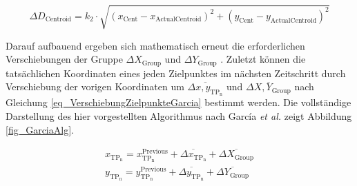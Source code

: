 \begin{equation} \label{eq_GarciaGruppenzentrumbewegung}
\Delta D_{\mathrm{Centroid}} = k_2 \cdot \sqrt{\left(x_{\mathrm{Cent}}-x_{\mathrm{Actual Centroid}}\right)^2+\left(y_{\mathrm{Cent}}-y_{\mathrm{Actual Centroid}}\right)^2}
\end{equation}

Darauf aufbauend ergeben sich mathematisch erneut die erforderlichen Verschiebungen der Gruppe $\Delta X_{\mathrm{Group}}$ und $\Delta Y_{\mathrm{Group}}$ \cite[S.10]{Garcia2}.
Zuletzt können die tatsächlichen Koordinaten eines jeden Zielpunktes im nächsten Zeitschritt durch Verschiebung der vorigen Koordinaten um $\overline{\Delta x,y_{\mathrm{TP_n}}}$ und $\overline{\Delta X,Y_{\mathrm{Group}}}$ nach Gleichung \ref{eq_VerschiebungZielpunkteGarcia} bestimmt werden.
Die vollständige Darstellung des hier vorgestellten Algorithmus nach García \textit{et al.} \cite{Garcia2} zeigt Abbildung \ref{fig_GarciaAlg}.

\begin{equation} \label{eq_VerschiebungZielpunkteGarcia}
    \begin{gathered}
        x_{\mathrm{TP_n}} = x^{\mathrm{Previous}}_{\mathrm{TP_n}} + \overline{\Delta x_{\mathrm{TP_n}}} + \overline{\Delta X_{\mathrm{Group}}} \\
        y_{\mathrm{TP_n}} = y^{\mathrm{Previous}}_{\mathrm{TP_n}} + \overline{\Delta y_{\mathrm{TP_n}}} + \overline{\Delta Y_{\mathrm{Group}}}
    \end{gathered}
\end{equation}



